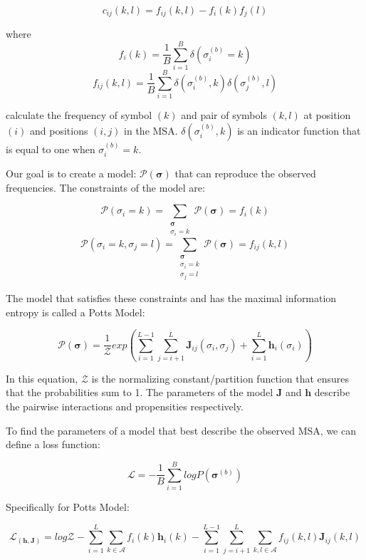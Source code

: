 $$c_{ij}(k, l) = f_{ij}(k, l) - f_i(k) f_j(l)$$
        
where
$$f_i(k) = \frac{1}{B} \sum_{i = 1}^B \delta(\sigma_i^{(b)} = k)$$
$$f_{ij}(k, l) = \frac{1}{B} \sum_{i = 1}^B \delta(\sigma_i^{(b)}, k)\delta(\sigma_j^{(b)}, l)$$
        
calculate the frequency of symbol $(k)$ and pair of symbols $(k, l)$ at position $(i)$ and positions $(i, j)$ in the MSA. 
$\delta(\sigma_i^{(b)}, k)$ is an indicator function that is equal to one when $\sigma_i^{(b)} = k$.
        
        
Our goal is to create a model: $\mathcal{P(\bm{\sigma})}$ that can reproduce the observed frequencies. 
The constraints of the model are:
        
$$\mathcal{P}(\sigma_i = k) = \sum_{\substack{\bm{\sigma}\\ \sigma_i = k}} \mathcal{P}(\bm{\sigma}) = f_i(k)$$
$$\mathcal{P}(\sigma_i = k, \sigma_j = l) = \sum_{\substack{\bm{\sigma}\\ \sigma_i = k \\ \sigma_j = l}} \mathcal{P}(\bm{\sigma}) = f_{ij}(k, l)$$
        
The model that satisfies these constraints and has the maximal information entropy is called a Potts Model:
        
\begin{equation}
    \mathcal{P}(\bm{\sigma}) = \frac{1}{\mathcal{Z}} exp\left(\sum_{i = 1}^{L-1} \sum_{j=i+1}^L \bm{J}_{ij}(\sigma_i, \sigma_j) + \sum_{i=1}^L \bm{h}_i({\sigma_i})\right)
    \label{eq:Potts}
\end{equation}
    
In this equation, $\mathcal{Z}$ is the normalizing constant/partition function that ensures that the probabilities sum to 1. 
The parameters of the model $\bm{J}$ and $\bm{h}$ describe the pairwise interactions and propensities respectively.
        
To find the parameters of a model that best describe the observed MSA, we can define a loss function:
        
\begin{equation}
    \mathcal{L} = -\frac{1}{B} \sum_{i=1}^B logP(\bm{\sigma}^{(b)})
    \label{eq:potts_loss}
\end{equation}
        
Specifically for Potts Model: 
        
\begin{equation}
    \mathcal{L}_(\bm{h}, \bm{J}) = log \mathcal{Z} - \sum_{i = 1}^L \sum_{k \in \mathcal{A}} f_i(k)\bm{h}_i(k) - \sum_{i = 1}^{L-1} \sum_{j=i+1}^L \sum_{k, l \in \mathcal{A}} f_{ij}(k, l) \bm{J}_{ij}(k, l)
    \label{potts_loss_ml}
\end{equation}
        
